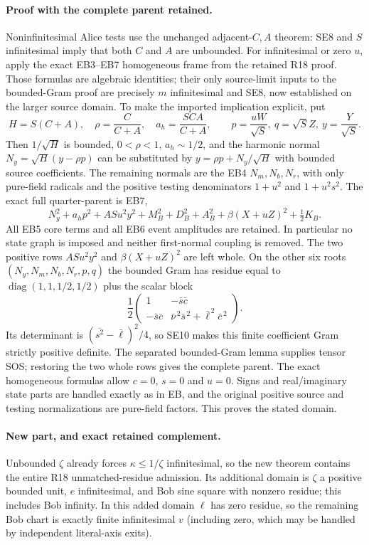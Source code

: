 \paragraph{Proof with the complete parent retained.}
Noninfinitesimal Alice tests use the unchanged adjacent-$C,A$ theorem:
SE8 and $S$ infinitesimal imply that both $C$ and $A$ are unbounded.
For infinitesimal or zero $u$, apply the exact EB3--EB7 homogeneous
frame from the retained R18 proof. Those formulas are algebraic identities;
their only source-limit inputs to the bounded-Gram proof are precisely
$m$ infinitesimal and SE8, now established on the larger source domain.
To make the imported implication explicit, put
\[
 H=S(C+A),\quad \rho=\frac C{C+A},\quad a_h=\frac{SCA}{C+A},
 \qquad p=\frac{uW}{\sqrt S},\ q=\sqrt S Z,\ y=\frac Y{\sqrt S}.
\]
Then $1/\sqrt H$ is bounded, $0<\rho<1$, $a_h\sim1/2$, and
the harmonic normal $N_y=\sqrt H(y-\rho p)$ can be substituted
by $y=\rho p+N_y/\sqrt H$ with bounded source coefficients.
The remaining normals are the EB4 $N_m,N_b,N_r$, with only pure-field
radicals and the positive testing denominators $1+u^2$ and $1+u^2s^2$.
The exact full quarter-parent is EB7,
\[
 N_y^2+a_hp^2+ASu^2y^2+M_B^2+D_B^2+A_B^2+\beta(X+uZ)^2
                         +\tfrac12 K_B.\tag{SE11}
\]
All EB5 core terms and all EB6 event amplitudes are retained. In particular
no state graph is imposed and neither first-normal coupling is removed.
The two positive rows $ASu^2y^2$ and $\beta(X+uZ)^2$ are left whole.
On the other six roots $(N_y,N_m,N_b,N_r,p,q)$ the bounded Gram has
residue equal to $\operatorname{diag}(1,1,1/2,1/2)$ plus the scalar block
\[
 \frac12\begin{pmatrix}
 1&-\bar s\bar c\\
 -\bar s\bar c&\bar\nu^{\,2}\bar s^{\,2}
                            +\bar\ell^{\,2}\bar c^{\,2}
 \end{pmatrix}.
\tag{SE12}
\]
Its determinant is $(\overline{s^2}-\bar\ell)^2/4$, so SE10
makes this finite coefficient Gram strictly positive definite. The
separated bounded-Gram lemma supplies tensor SOS; restoring the two
whole rows gives the complete parent. The exact homogeneous formulas
allow $c=0$, $s=0$ and $u=0$. Signs and real/imaginary state parts are
handled exactly as in EB, and the original positive source and testing
normalizations are pure-field factors. This proves the stated domain.

\paragraph{New part, and exact retained complement.}
Unbounded $\zeta$ already forces $\kappa\le1/\zeta$ infinitesimal,
so the new theorem contains the entire R18 unmatched-residue admission.
Its additional domain is $\zeta$ a positive bounded unit, $e$
infinitesimal, and Bob sine square with nonzero residue; this includes
Bob infinity. In this added domain $\ell$ has zero residue, so the
remaining Bob chart is exactly finite infinitesimal $v$ (including zero,
which may be handled by independent literal-axis exits).

